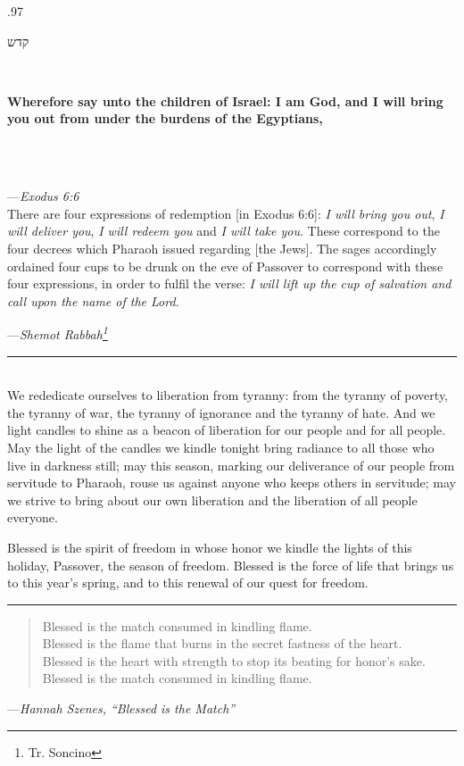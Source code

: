 \documentclass[letter,11pt,openany]{memoir}
\newcommand{\HgInst}[1]{{
\noindent\sffamily{\bfseries{#1}}}}
\newcommand{\HgSource}[1]{\hfill{\small---\itshape{#1}}}
\newcommand{\hchapter}[1]{ 
\begin{hebrew}
	\begin{Spacing}
		{.97} 
		\newpage \strut
		
		\vspace{.15em}
		\begin{flushleft}
			\noindent\Huge #1 
		\end{flushleft}
		
		\vspace{1em} 
	\end{Spacing}
\end{hebrew}

}
\newcommand{\HgHL}[1]{{\Large\textbf{#1}\par
\noindent\\[-.5em]}}
\newcommand{\HgFill}{
\vfill \hrule 
\vfill}
\newenvironment{HgEnglish}{\strut\\
\noindent}{\vspace{1em}}
\newcommand{\JSrc}{\textsuperscript{\upshape{[J]}}}
\newcommand{\SSrc}{\textsuperscript{\upshape{[S]}}}
\begin{document}
\HgInst{Drink the first cup.}

\vfill

\hchapter{קדש}
\begin{HgEnglish}
	\HgHL{ Wherefore say unto the children of Israel: I am God, and I will bring you out from under the burdens of the Egyptians,}\\[-3em]
	
	\HgSource{Exodus 6:6 \JSrc}\\
	
	\noindent There are four expressions of redemption [in Exodus 6:6]: {\itshape I will bring you out}, {\itshape I will deliver you}, {\itshape I will redeem you} and {\itshape I will take you}. These correspond to the four decrees which Pharaoh issued regarding [the Jews]. The sages accordingly ordained four cups to be drunk on the eve of Passover to correspond with these four expressions, in order to fulfil the verse: {\itshape I will lift up the cup of salvation and call upon the name of the Lord.}
	
	\HgSource{Shemot Rabbah\footnote{Tr. Soncino}} 
\end{HgEnglish}

\HgFill
\begin{HgEnglish}
	[{\itshape On Shabbat:}] We rededicate ourselves to liberation from tyranny: from the tyranny of poverty, the tyranny of war, the tyranny of ignorance and the tyranny of hate. And we light candles to shine as a beacon of liberation for our people and for all people. May the light of the candles we kindle tonight bring radiance to all those who live in darkness still; may this season, marking our deliverance of our people from servitude to Pharaoh, rouse us against anyone who keeps others in servitude; may we strive to bring about our own liberation and the liberation of all people everyone.
	
	Blessed is the spirit of freedom in whose honor we kindle the lights of this holiday, Passover, the season of freedom. Blessed is the force of life that brings us to this year’s spring, and to this renewal of our quest for freedom. \SSrc 
\end{HgEnglish}

\HgFill
\begin{verse}
	Blessed is the match consumed in kindling flame. \\
	Blessed is the flame that burns in the secret fastness of the heart. \\
	Blessed is the heart with strength to stop its beating for honor's sake. \\
	Blessed is the match consumed in kindling flame. 
\end{verse}
\HgSource{Hannah Szenes, ``Blessed is the Match''}
\end{document}
